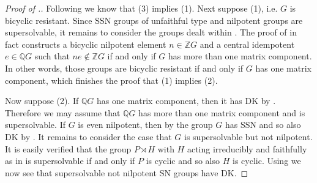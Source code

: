 \documentclass[a4paper,10pt]{amsart}
\theoremstyle{definition}
\theoremstyle{remark}
\newcommand{\Q}{{\mathbb Q}}
\begin{document}
\begin{proof}[Proof of .]
Following  we know that (3) implies (1). Next suppose (1), i.e. $G$ is bicyclic resistant. Since SSN groups of unfaithful type and nilpotent groups are supersolvable, it remains to consider the groups dealt within . The proof of  in fact constructs a bicyclic nilpotent element $n \in \mathbb{Z}G$ and a central idempotent $e \in \Q G$ such that $ne \notin \mathbb{Z}G$ if and only if $G$ has more than one matrix component. In other words, those groups are bicyclic resistant if and only if $G$ has one matrix component, which finishes the proof that (1) implies (2).

Now suppose (2). If $\Q G$ has one matrix component, then it has DK by . Therefore we may assume that $\Q G$ has more than one matrix component and is supersolvable. If $G$ is even nilpotent, then by  the group $G$ has SSN and so also DK by .
It remains to consider the case that $G$ is supersolvable but not nilpotent. It is easily verified that the group $P \rtimes H$ with $H$ acting irreducibly and faithfully as in  is supersolvable if and only if $P$ is cyclic and so also $H$ is cyclic. Using  we now see that   supersolvable not nilpotent SN groups have DK. 
\end{proof}
\end{document}

